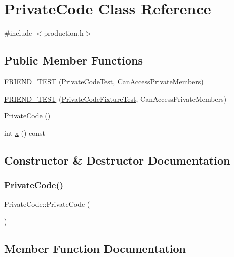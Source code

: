 \hypertarget{class_private_code}{}\section{Private\+Code Class Reference}
\label{class_private_code}


{\ttfamily \#include $<$production.\+h$>$}

\subsection*{Public Member Functions}
\begin{DoxyCompactItemize}
\item 
\hyperlink{class_private_code_a9a74a333501232539ab1636f0928d8f2}{F\+R\+I\+E\+N\+D\+\_\+\+T\+E\+ST} (Private\+Code\+Test, Can\+Access\+Private\+Members)
\item 
\hyperlink{class_private_code_a29b6823300f68d78691476eeeaed8a7c}{F\+R\+I\+E\+N\+D\+\_\+\+T\+E\+ST} (\hyperlink{gtest__prod__test_8cc_a89debba10c803e339ce0f9b0b34a2267}{Private\+Code\+Fixture\+Test}, Can\+Access\+Private\+Members)
\item 
\hyperlink{class_private_code_affe538411a99919d24ef09dffe1bb3eb}{Private\+Code} ()
\item 
int \hyperlink{class_private_code_a247781246ce4d0c66563eaa39ba5aaa9}{x} () const
\end{DoxyCompactItemize}


\subsection{Constructor \& Destructor Documentation}
\mbox{\label{class_private_code_affe538411a99919d24ef09dffe1bb3eb}} 
\subsubsection{\texorpdfstring{Private\+Code()}{PrivateCode()}}
{\footnotesize\ttfamily Private\+Code\+::\+Private\+Code (\begin{DoxyParamCaption}{ }\end{DoxyParamCaption})}



\subsection{Member Function Documentation}
\mbox{\label{class_private_code_a9a74a333501232539ab1636f0928d8f2}} 
